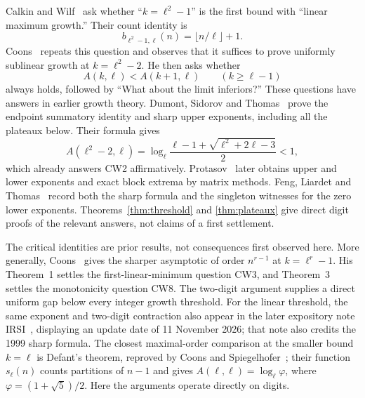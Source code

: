 \documentclass[11pt]{article}
\begin{document}
Calkin and Wilf~\cite[Section~10, p.~18, Question~2]{CW} ask whether
``$k=\ell^2-1$'' is the first bound with ``linear maximum growth.''
Their count identity is
\begin{equation}\label{eq:critical}
 b_{\ell^2-1,\ell}(n)=\lfloor n/\ell\rfloor+1.
\end{equation}
Coons~\cite[Section~1, CW2; Section~3, last paragraph]{Coons}
repeats this question and observes that it suffices to prove uniformly
sublinear growth at $k=\ell^2-2$.
He then asks whether
\begin{equation}\label{eq:posed}
 A(k,\ell)<A(k+1,\ell)\qquad(k\ge\ell-1)
\end{equation}
always holds, followed by ``What about the limit inferiors?''
These questions have answers in earlier growth theory.
Dumont, Sidorov and Thomas~\cite[Propositions~6.8--6.9]{DST} prove
the endpoint summatory identity and sharp upper exponents, including
all the plateaux below. Their formula gives
\[
 A(\ell^2-2,\ell)=\log_\ell
 \frac{\ell-1+\sqrt{\ell^2+2\ell-3}}2<1,
\]
which already answers CW2 affirmatively.
Protasov~\cite[Section~5, pp.~398--400]{Protasov} later obtains
upper and lower exponents and exact block extrema by matrix methods.
Feng, Liardet and Thomas~\cite[p.~50, after equation~(14)]{FLT}
record both the sharp formula and the singleton witnesses for the
zero lower exponents. Theorems~\ref{thm:threshold} and
\ref{thm:plateaux} give direct digit proofs of the relevant answers,
not claims of a first settlement.

The critical identities are prior results, not consequences first
observed here. More generally, Coons~\cite[Theorem~2, equation~(4)]{Coons}
gives the sharper asymptotic of order $n^{r-1}$ at $k=\ell^r-1$.
His Theorem~1 settles the first-linear-minimum question CW3, and
Theorem~3 settles the monotonicity question CW8.
The two-digit argument supplies a direct uniform gap below every integer
growth threshold. For the linear threshold, the same exponent and
two-digit contraction also appear in the later expository note
IRSI~\cite[Sections~4--5]{IRSI}, displaying an update date of
11 November 2026; that note also credits the 1999 sharp formula.
The closest maximal-order comparison at the smaller
bound $k=\ell$ is Defant's theorem, reproved by Coons and
Spiegelhofer~\cite[Theorem~1]{CS}; their function $s_\ell(n)$ counts
partitions of $n-1$ and gives $A(\ell,\ell)=\log_\ell\varphi$,
where $\varphi=(1+\sqrt5)/2$.
Here the arguments operate directly on digits.
\end{document}

